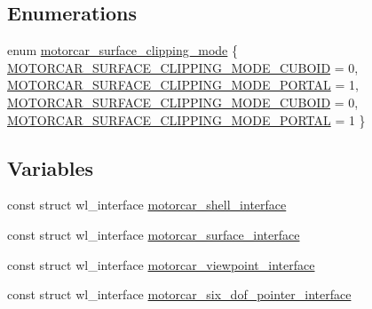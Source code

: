 \subsection*{Enumerations}
\begin{DoxyCompactItemize}
\item 
enum \hyperlink{motorcar-server-protocol_8h_a4609d9d55b9d8b4d07c8dd85fa4ec19d}{motorcar\-\_\-surface\-\_\-clipping\-\_\-mode} \{ \hyperlink{motorcar-client-protocol_8h_a4609d9d55b9d8b4d07c8dd85fa4ec19dadc771a7d9ed6aed47be1b126978a465a}{M\-O\-T\-O\-R\-C\-A\-R\-\_\-\-S\-U\-R\-F\-A\-C\-E\-\_\-\-C\-L\-I\-P\-P\-I\-N\-G\-\_\-\-M\-O\-D\-E\-\_\-\-C\-U\-B\-O\-I\-D} = 0, 
\hyperlink{motorcar-client-protocol_8h_a4609d9d55b9d8b4d07c8dd85fa4ec19da5459ef74d3fb34c194e2a26e3f3d3a40}{M\-O\-T\-O\-R\-C\-A\-R\-\_\-\-S\-U\-R\-F\-A\-C\-E\-\_\-\-C\-L\-I\-P\-P\-I\-N\-G\-\_\-\-M\-O\-D\-E\-\_\-\-P\-O\-R\-T\-A\-L} = 1, 
\hyperlink{motorcar-server-protocol_8h_a4609d9d55b9d8b4d07c8dd85fa4ec19dadc771a7d9ed6aed47be1b126978a465a}{M\-O\-T\-O\-R\-C\-A\-R\-\_\-\-S\-U\-R\-F\-A\-C\-E\-\_\-\-C\-L\-I\-P\-P\-I\-N\-G\-\_\-\-M\-O\-D\-E\-\_\-\-C\-U\-B\-O\-I\-D} = 0, 
\hyperlink{motorcar-server-protocol_8h_a4609d9d55b9d8b4d07c8dd85fa4ec19da5459ef74d3fb34c194e2a26e3f3d3a40}{M\-O\-T\-O\-R\-C\-A\-R\-\_\-\-S\-U\-R\-F\-A\-C\-E\-\_\-\-C\-L\-I\-P\-P\-I\-N\-G\-\_\-\-M\-O\-D\-E\-\_\-\-P\-O\-R\-T\-A\-L} = 1
 \}
\end{DoxyCompactItemize}
\subsection*{Variables}
\begin{DoxyCompactItemize}
\item 
const struct wl\-\_\-interface \hyperlink{motorcar-server-protocol_8h_a4decf5a74ff7a553e7cb41be3a9c580e}{motorcar\-\_\-shell\-\_\-interface}
\item 
const struct wl\-\_\-interface \hyperlink{motorcar-server-protocol_8h_ae2e8f3ce5b87226a6df640361441f5ce}{motorcar\-\_\-surface\-\_\-interface}
\item 
const struct wl\-\_\-interface \hyperlink{motorcar-server-protocol_8h_a90843869d07a9812f0b0eb66ed03ed20}{motorcar\-\_\-viewpoint\-\_\-interface}
\item 
const struct wl\-\_\-interface \hyperlink{motorcar-server-protocol_8h_abbda765471c6cc2c3eb8efb2e5a22cbb}{motorcar\-\_\-six\-\_\-dof\-\_\-pointer\-\_\-interface}
\end{DoxyCompactItemize}


